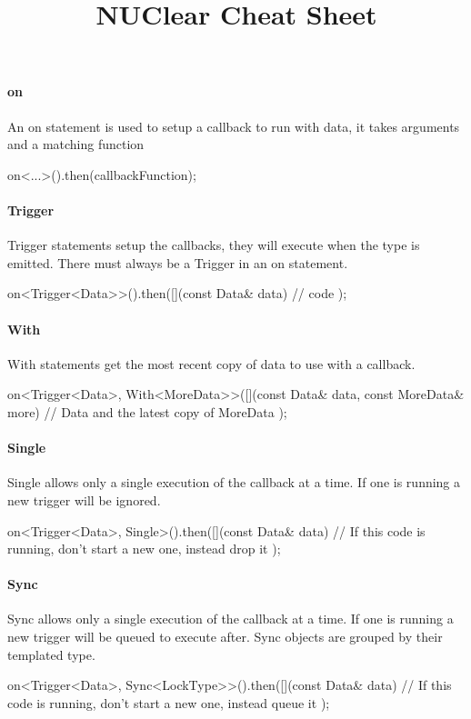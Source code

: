 \documentclass[a4paper]{article}
\title{NUClear Cheat Sheet}
\date{\vspace{-5ex}}
\author{\vspace{-5ex}}
\begin{document}
\maketitle

    \paragraph{on} An on statement is used to setup a callback to run with data, it takes arguments and a matching function
    \begin{cppcode}
        on<...>().then(callbackFunction);
    \end{cppcode}

    \paragraph{Trigger} Trigger statements setup the callbacks, they will execute when the type is emitted.
    There must always be a Trigger in an on statement.\\
    \begin{cppcode}
        on<Trigger<Data>>().then([](const Data& data) {
            // code
        });
    \end{cppcode}

    \paragraph{With} With statements get the most recent copy of data to use with a callback.\\
    \begin{cppcode}
        on<Trigger<Data>, With<MoreData>>([](const Data& data, const MoreData& more) {
            // Data and the latest copy of MoreData
        });
    \end{cppcode}

    \paragraph{Single} Single allows only a single execution of the callback at a time.
    If one is running a new trigger will be ignored.
    \begin{cppcode}
        on<Trigger<Data>, Single>().then([](const Data& data) {
            // If this code is running, don't start a new one, instead drop it
        });
    \end{cppcode}

    \paragraph{Sync} Sync allows only a single execution of the callback at a time.
    If one is running a new trigger will be queued to execute after.
    Sync objects are grouped by their templated type.\\
    \begin{cppcode}
        on<Trigger<Data>, Sync<LockType>>().then([](const Data& data) {
            // If this code is running, don't start a new one, instead queue it
        });
    \end{cppcode}
\end{document}
